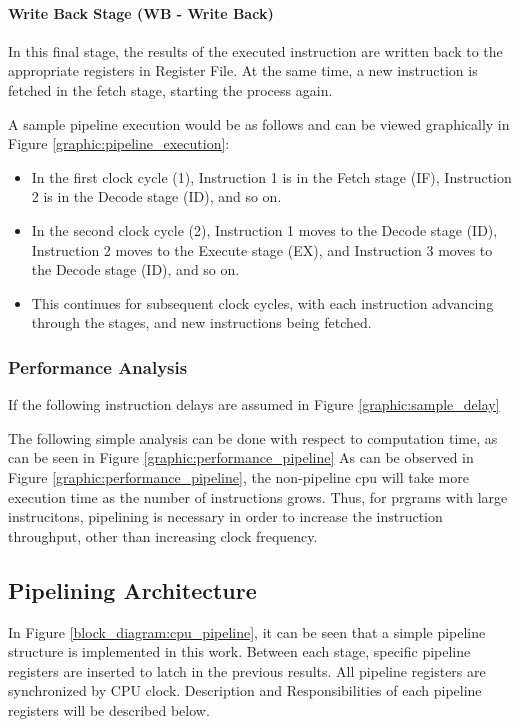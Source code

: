 \paragraph*{Write Back Stage (WB - Write Back)}
In this final stage, the results of the executed instruction are written back to the appropriate registers in Register File.
At the same time, a new instruction is fetched in the fetch stage, starting the process again.

\newpage
{}
A sample pipeline execution would be as follows and can be viewed graphically in Figure \ref{graphic:pipeline_execution}:
\begin{itemize}
    \item In the first clock cycle (1), Instruction 1 is in the Fetch stage (IF), Instruction 2 is in the Decode stage (ID), and so on.
    \item In the second clock cycle (2), Instruction 1 moves to the Decode stage (ID), Instruction 2 moves to the Execute stage (EX), and Instruction 3 moves to the Decode stage (ID), and so on.
    \item This continues for subsequent clock cycles, with each instruction advancing through the stages, and new instructions being fetched.
\end{itemize}

\subsubsection{Performance Analysis}
If the following instruction delays are assumed in Figure \ref{graphic:sample_delay}

The following simple analysis can be done with respect to computation time, as can be seen in Figure \ref{graphic:performance_pipeline}
As can be observed in Figure \ref{graphic:performance_pipeline}, the non-pipeline cpu will take more execution time as the number of instructions grows.
Thus, for prgrams with large instrucitons, pipelining is necessary in order to increase the instruction throughput, other than increasing clock frequency.

\newpage
\subsection{Pipelining Architecture}
In Figure \ref{block_diagram:cpu_pipeline}, it can be seen that a simple pipeline structure is implemented in this work.
Between each stage, specific pipeline registers are inserted to latch in the previous results.
All pipeline registers are synchronized by CPU clock.
Description and Responsibilities of each pipeline registers will be described below.
